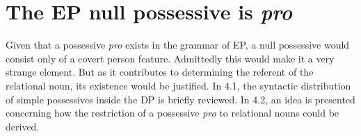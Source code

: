 \documentclass[output=paper]{langsci/langscibook}
\begin{document}
\section{The EP null possessive is \textit{pro}}%

Given that a possessive \textit{pro} exists in the grammar of EP, a null possessive would consist only of a covert person feature. Admittedly this would make it a very strange element. But as it contributes to determining the referent of the relational noun, its existence would be justified. In 4.1, the syntactic distribution of simple possessives inside the DP is briefly reviewed. In 4.2, an idea is presented concerning how the restriction of a possessive \textit{pro} to relational nouns could be derived.
% 
% 
% 
% 
% 
% 
% 
% 
% 
% 
% 
\end{document}
